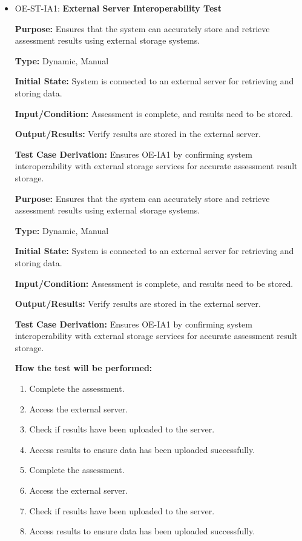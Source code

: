 \documentclass[12pt, titlepage]{article}
\begin{document}
\begin{itemize}
  \item OE-ST-IA1: \textbf{External Server Interoperability Test}
  \begin{mdframed}[linewidth=0.5mm]
      \textbf{Purpose:} Ensures that the system can accurately store and retrieve assessment results using external storage systems. \par
      \textbf{Type:} Dynamic, Manual \par
      \textbf{Initial State:} System is connected to an external server for retrieving and storing data. \par
      \textbf{Input/Condition:} Assessment is complete, and results need to be stored. \par
      \textbf{Output/Results:} Verify results are stored in the external server. \par
      \textbf{Test Case Derivation:} Ensures OE-IA1 by confirming system interoperability with external storage services for accurate assessment result storage. \par
      \textbf{Purpose:} Ensures that the system can accurately store and retrieve assessment results using external storage systems. \par
      \textbf{Type:} Dynamic, Manual \par
      \textbf{Initial State:} System is connected to an external server for retrieving and storing data. \par
      \textbf{Input/Condition:} Assessment is complete, and results need to be stored. \par
      \textbf{Output/Results:} Verify results are stored in the external server. \par
      \textbf{Test Case Derivation:} Ensures OE-IA1 by confirming system interoperability with external storage services for accurate assessment result storage. \par
      \textbf{How the test will be performed:}
      \begin{enumerate}[noitemsep]
        \item Complete the assessment.
        \item Access the external server.
        \item Check if results have been uploaded to the server.
        \item Access results to ensure data has been uploaded successfully.
        \item Complete the assessment.
        \item Access the external server.
        \item Check if results have been uploaded to the server.
        \item Access results to ensure data has been uploaded successfully.
      \end{enumerate}
  \end{mdframed}


\end{itemize}
\end{document}
